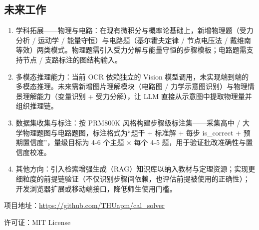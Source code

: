 \documentclass[12pt,a4paper]{ctexart}
\begin{document}
\subsection{未来工作}

\begin{enumerate}[nosep]
  \item 学科拓展——物理与电路：在现有微积分与概率论基础上，新增物理题（受力分析 / 运动学 / 能量守恒）与电路题（基尔霍夫定律 / 节点电压法 / 戴维南等效）两类模式。物理题需引入受力分解与能量守恒的步骤模板；电路题需支持节点 / 支路标注的图结构输入。
  \item 多模态推理能力：当前 OCR 依赖独立的 Vision 模型调用，未实现端到端的多模态推理。未来需新增图片理解模块（电路图 / 力学示意图识别）与物理情景理解能力（变量识别 + 受力分解），让 LLM 直接从示意图中提取物理量并组织推理链。
  \item 数据集收集与标注：按 PRM800K 风格构建步骤级标注集——采集高中 / 大学物理题图与电路题图，标注格式为“题干 + 标准解 + 每步 is\_correct + 预期置信度”，量级目标为 4-6 个主题 × 每个 4-5 题，用于验证批改准确性与置信度校准。
  \item 其他方向：引入检索增强生成（RAG）知识库以纳入教材与定理资源；实现更细粒度的前提链验证（不仅识别步骤间依赖，也评估前提被使用的正确性）；开发浏览器扩展或移动端接口，降低师生使用门槛。
\end{enumerate}

\vspace{1cm}
\noindent 项目地址：\url{https://github.com/THUapm/cal_solver}

\noindent 许可证：MIT License
\end{document}
